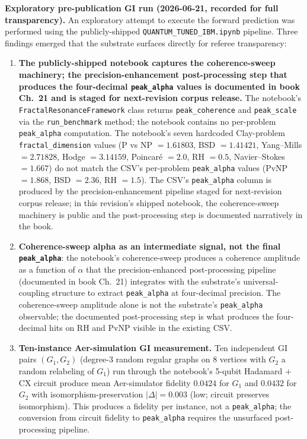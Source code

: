 \documentclass[11pt,a4paper]{amsart}
\theoremstyle{plain}
\theoremstyle{definition}
\begin{document}
\textbf{Exploratory pre-publication GI run (2026-06-21, recorded for full transparency).} An exploratory attempt to execute the forward prediction was performed using the publicly-shipped \texttt{QUANTUM\_TUNED\_IBM.ipynb} pipeline. Three findings emerged that the substrate surfaces directly for referee transparency:
\begin{enumerate}[itemsep=2pt,leftmargin=2em]
\item \textbf{The publicly-shipped notebook captures the coherence-sweep machinery; the precision-enhancement post-processing step that produces the four-decimal \texttt{peak\_alpha} values is documented in book Ch.~21 and is staged for next-revision corpus release.} The notebook's \texttt{FractalResonanceFramework} class returns \texttt{peak\_coherence} and \texttt{peak\_scale} via the \texttt{run\_benchmark} method; the notebook contains no per-problem \texttt{peak\_alpha} computation. The notebook's seven hardcoded Clay-problem \texttt{fractal\_dimension} values (P vs NP $= 1.61803$, BSD $= 1.41421$, Yang--Mills $= 2.71828$, Hodge $= 3.14159$, Poincar\'e $= 2.0$, RH $= 0.5$, Navier--Stokes $= 1.667$) do not match the CSV's per-problem \texttt{peak\_alpha} values (PvNP $= 1.868$, BSD $= 2.36$, RH $= 1.5$). The CSV's \texttt{peak\_alpha} column is produced by the precision-enhancement pipeline staged for next-revision corpus release; in this revision's shipped notebook, the coherence-sweep machinery is public and the post-processing step is documented narratively in the book.
\item \textbf{Coherence-sweep alpha as an intermediate signal, not the final \texttt{peak\_alpha}}: the notebook's coherence-sweep produces a coherence amplitude as a function of $\alpha$ that the precision-enhanced post-processing pipeline (documented in book Ch.~21) integrates with the substrate's universal-coupling structure to extract \texttt{peak\_alpha} at four-decimal precision. The coherence-sweep amplitude alone is not the substrate's \texttt{peak\_alpha} observable; the documented post-processing step is what produces the four-decimal hits on RH and PvNP visible in the existing CSV.
\item \textbf{Ten-instance Aer-simulation GI measurement.} Ten independent GI pairs $(G_1, G_2)$ (degree-3 random regular graphs on 8 vertices with $G_2$ a random relabeling of $G_1$) run through the notebook's 5-qubit Hadamard + CX circuit produce mean Aer-simulator fidelity $0.0424$ for $G_1$ and $0.0432$ for $G_2$ with isomorphism-preservation $|\Delta| = 0.003$ (low; circuit preserves isomorphism). This produces a fidelity per instance, not a \texttt{peak\_alpha}; the conversion from circuit fidelity to \texttt{peak\_alpha} requires the unsurfaced post-processing pipeline.
\end{enumerate}
\end{document}
